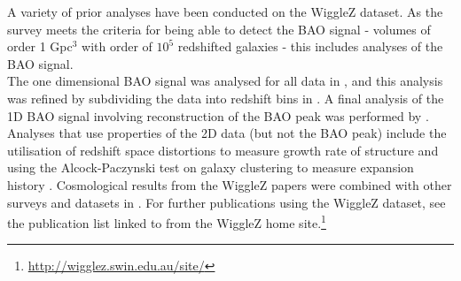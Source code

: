 \documentclass[titlesmallcaps, examinerscopy, copyrightpage]{uqthesis}
\begin{document}
A variety of prior analyses have been conducted on the WiggleZ dataset. As the survey meets the criteria for being able to detect the BAO signal - volumes of order 1 Gpc$^3$ with order of $10^5$ redshifted galaxies \citep{Tegmark1997,BlakeGlazebrook2003,BlakeParkinson2006} - this includes analyses of the BAO signal.\\


The one dimensional BAO signal was analysed for all data in \citet{BlakeDavis2011}, and this analysis was refined by subdividing the data into redshift bins in \citet{BlakeKazin2011}. A final analysis of the 1D BAO signal involving reconstruction of the BAO peak was performed by \citet{KazinKoda2014}. Analyses that use properties of the 2D data (but not the BAO peak) include the utilisation of redshift space distortions to measure growth rate of structure \citep{BlakeBroughColless2011,ContrerasBlake2013} and using the Alcock-Paczynski test on galaxy clustering to measure expansion history \citep{BlakeGlazebrook2011}. Cosmological results from the WiggleZ papers were combined with other surveys and datasets in \citet{Parkinson2012}. For further publications using the WiggleZ dataset, see the publication list linked to from the WiggleZ home site.\footnote{\url{http://wigglez.swin.edu.au/site/}}\\

\end{document}
